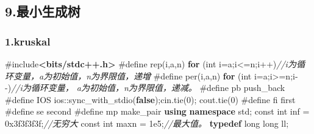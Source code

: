 \documentclass[
]{article}
\newenvironment{Shaded}{}{}
\newcommand{\AttributeTok}[1]{\textcolor[rgb]{0.49,0.56,0.16}{#1}}
\newcommand{\BaseNTok}[1]{\textcolor[rgb]{0.25,0.63,0.44}{#1}}
\newcommand{\CommentTok}[1]{\textcolor[rgb]{0.38,0.63,0.69}{\textit{#1}}}
\newcommand{\ControlFlowTok}[1]{\textcolor[rgb]{0.00,0.44,0.13}{\textbf{#1}}}
\newcommand{\DataTypeTok}[1]{\textcolor[rgb]{0.56,0.13,0.00}{#1}}
\newcommand{\DecValTok}[1]{\textcolor[rgb]{0.25,0.63,0.44}{#1}}
\newcommand{\FloatTok}[1]{\textcolor[rgb]{0.25,0.63,0.44}{#1}}
\newcommand{\ImportTok}[1]{\textcolor[rgb]{0.00,0.50,0.00}{\textbf{#1}}}
\newcommand{\KeywordTok}[1]{\textcolor[rgb]{0.00,0.44,0.13}{\textbf{#1}}}
\newcommand{\NormalTok}[1]{#1}
\newcommand{\OperatorTok}[1]{\textcolor[rgb]{0.40,0.40,0.40}{#1}}
\newcommand{\PreprocessorTok}[1]{\textcolor[rgb]{0.74,0.48,0.00}{#1}}
\begin{document}
\hypertarget{9ux6700ux5c0fux751fux6210ux6811}{%
\subsection{9.最小生成树}\label{9ux6700ux5c0fux751fux6210ux6811}}

\hypertarget{1kruskal}{%
\subsubsection{1.kruskal}\label{1kruskal}}

\begin{Shaded}
\begin{Highlighting}[]
\PreprocessorTok{\#include}\ImportTok{\textless{}bits/stdc++.h\textgreater{}}
\PreprocessorTok{\#define rep}\OperatorTok{(}\NormalTok{i}\OperatorTok{,}\NormalTok{a}\OperatorTok{,}\NormalTok{n}\OperatorTok{)}\PreprocessorTok{ }\ControlFlowTok{for}\PreprocessorTok{ }\OperatorTok{(}\DataTypeTok{int}\PreprocessorTok{ }\NormalTok{i}\OperatorTok{=}\NormalTok{a}\OperatorTok{;}\NormalTok{i}\OperatorTok{\textless{}=}\NormalTok{n}\OperatorTok{;}\NormalTok{i}\OperatorTok{++)}\CommentTok{//i为循环变量，a为初始值，n为界限值，递增}
\PreprocessorTok{\#define per}\OperatorTok{(}\NormalTok{i}\OperatorTok{,}\NormalTok{a}\OperatorTok{,}\NormalTok{n}\OperatorTok{)}\PreprocessorTok{ }\ControlFlowTok{for}\PreprocessorTok{ }\OperatorTok{(}\DataTypeTok{int}\PreprocessorTok{ }\NormalTok{i}\OperatorTok{=}\NormalTok{a}\OperatorTok{;}\NormalTok{i}\OperatorTok{\textgreater{}=}\NormalTok{n}\OperatorTok{;}\NormalTok{i}\OperatorTok{{-}{-})}\CommentTok{//i为循环变量， a为初始值，n为界限值，递减。}
\PreprocessorTok{\#define pb }\NormalTok{push\_back}
\PreprocessorTok{\#define IOS }\NormalTok{ios}\OperatorTok{::}\NormalTok{sync\_with\_stdio}\OperatorTok{(}\KeywordTok{false}\OperatorTok{);}\NormalTok{cin}\OperatorTok{.}\NormalTok{tie}\OperatorTok{(}\DecValTok{0}\OperatorTok{);}\PreprocessorTok{ }\NormalTok{cout}\OperatorTok{.}\NormalTok{tie}\OperatorTok{(}\DecValTok{0}\OperatorTok{)}
\PreprocessorTok{\#define fi }\NormalTok{first}
\PreprocessorTok{\#define se }\NormalTok{second}
\PreprocessorTok{\#define mp }\NormalTok{make\_pair}
\KeywordTok{using} \KeywordTok{namespace}\NormalTok{ std}\OperatorTok{;}
\AttributeTok{const} \DataTypeTok{int}\NormalTok{ inf }\OperatorTok{=} \BaseNTok{0x3f3f3f3f}\OperatorTok{;}\CommentTok{//无穷大}
\AttributeTok{const} \DataTypeTok{int}\NormalTok{ maxn }\OperatorTok{=} \FloatTok{1e5}\OperatorTok{;}\CommentTok{//最大值。}
\KeywordTok{typedef} \DataTypeTok{long} \DataTypeTok{long}\NormalTok{ ll}\OperatorTok{;}

\end{Highlighting}
\end{Shaded}
\end{document}
